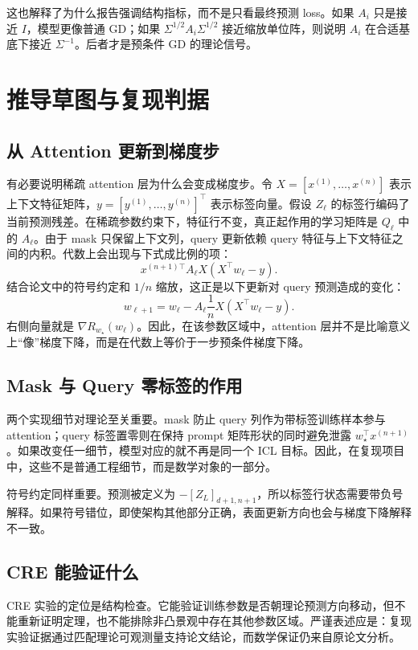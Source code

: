 \documentclass[conference]{IEEEtran}
\newcommand{\wstar}{w_\star}
\begin{document}
这也解释了为什么报告强调结构指标，而不是只看最终预测 loss。如果 $A_i$ 只是接近 $I$，模型更像普通 GD；如果 $\Sigma^{1/2}A_i\Sigma^{1/2}$ 接近缩放单位阵，则说明 $A_i$ 在合适基底下接近 $\Sigma^{-1}$。后者才是预条件 GD 的理论信号。

\section{推导草图与复现判据}
\subsection{从 Attention 更新到梯度步}
有必要说明稀疏 attention 层为什么会变成梯度步。令 $X=[x^{(1)},\ldots,x^{(n)}]$ 表示上下文特征矩阵，$y=[y^{(1)},\ldots,y^{(n)}]^\top$ 表示标签向量。假设 $Z_\ell$ 的标签行编码了当前预测残差。在稀疏参数约束下，特征行不变，真正起作用的学习矩阵是 $Q_\ell$ 中的 $A_\ell$。由于 mask 只保留上下文列，query 更新依赖 query 特征与上下文特征之间的内积。代数上会出现与下式成比例的项：
\begin{equation}
x^{(n+1)\top}A_\ell X\left(X^\top w_\ell-y\right).
\end{equation}
结合论文中的符号约定和 $1/n$ 缩放，这正是以下更新对 query 预测造成的变化：
\begin{equation}
w_{\ell+1}=w_\ell-A_\ell\frac{1}{n}X(X^\top w_\ell-y).
\end{equation}
右侧向量就是 $\nabla R_{\wstar}(w_\ell)$。因此，在该参数区域中，attention 层并不是比喻意义上“像”梯度下降，而是在代数上等价于一步预条件梯度下降。

\subsection{Mask 与 Query 零标签的作用}
两个实现细节对理论至关重要。mask 防止 query 列作为带标签训练样本参与 attention；query 标签置零则在保持 prompt 矩阵形状的同时避免泄露 $\wstar^\top x^{(n+1)}$。如果改变任一细节，模型对应的就不再是同一个 ICL 目标。因此，在复现项目中，这些不是普通工程细节，而是数学对象的一部分。

符号约定同样重要。预测被定义为 $-[Z_L]_{d+1,n+1}$，所以标签行状态需要带负号解释。如果符号错位，即使架构其他部分正确，表面更新方向也会与梯度下降解释不一致。

\subsection{CRE 能验证什么}
CRE 实验的定位是结构检查。它能验证训练参数是否朝理论预测方向移动，但不能重新证明定理，也不能排除非凸景观中存在其他参数区域。严谨表述应是：复现实验证据通过匹配理论可观测量支持论文结论，而数学保证仍来自原论文分析。
\end{document}
